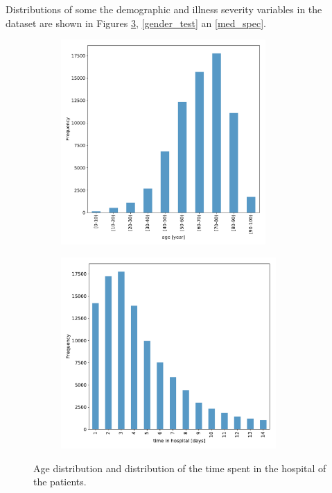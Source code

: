 \documentclass[12pt]{article}
\begin{document}
Distributions of some the demographic and illness severity variables in the dataset are shown in Figures \ref{time}, \ref{gender_test} an \ref{med_spec}.

\begin{figure}[t!]
	\hspace{-0.45cm}
    \begin{subfigure}[b]{0.5\textwidth}
    	\hspace{-.5cm}
        \includegraphics[width=7.8cm]{age.pdf}
        \label{fig:chi_FD}
    \end{subfigure}
    \hspace{0.75cm} %
    \begin{subfigure}[b]{0.5\textwidth}
    	\hspace{-0.5cm}
    	\vspace{+0.47cm}
        \includegraphics[width=8.2cm]{time_in_hospital.pdf}
        \label{fig:chi_Dz}
    \end{subfigure}    

   \caption{\small Age distribution and distribution of the time spent in the hospital of the patients.}
    \label{time}
\end{figure}
\end{document}
